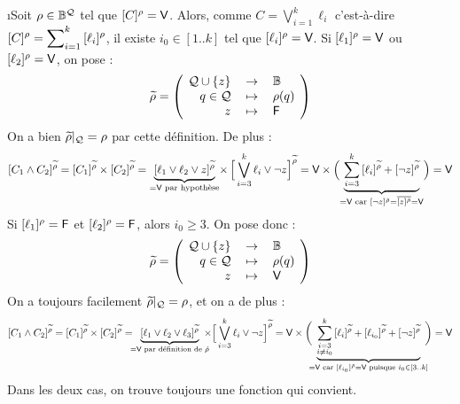 		\eqskip{1mm}
		\begin{Preuve}
			\i Soit \(\rho \in \bb{B}^\cal{Q}\) tel que \(\itp{C}{\rho} = \V\). Alors, comme \(\displaystyle C = \bigvee\nolimits_{i=1}^k \ell_i\) c'est-à-dire \(\displaystyle \itp{C}{\rho} = \sum\nolimits_{i=1}^k \, \itp{\ell_i}{\rho}\), il existe \(i_0 \in [1..k]\) tel que \(\itp{\ell_i}{\rho} = \V\). \nt
				\setlength{\tabcolsep}{2.2pt}
				\bdot Si \(\itp{\ell_1}{\rho} = \V\) ou \(\itp{\ell_2}{\rho} = \V\), on pose : 
					\[
						\widetilde{\rho} = \left( \! \begin{tabular}[h]{rcl}
							\(\cal{Q} \cup \{z\}\) & \(\rightarrow\) & \(\bb{B}\) \\
							\(q \in \cal{Q}\) & \(\mapsto\) & \(\rho(q)\) \\
							\(z\) & \(\mapsto\) & \(\F\)
						\end{tabular} \! \right)
					\]
				On a bien \(\widetilde{\rho} |_\cal{Q} = \rho\) par cette définition. De plus :
				\[ 
					\itp{C_1 \wedge C_2}{\widetilde{\rho}} = \itp{C_1}{\widetilde{\rho}} \times \itp{C_2}{\widetilde{\rho}} = \underbrace{\itp{\ell_1 \vee \ell_2 \vee z}{\widetilde{\rho}}}_{=\V \text{ par hypothèse}} \! \times \, \Big[ \bigvee_{i=3}^k \ell_i \vee \neg z \Big]^{\widetilde{\rho}} = \V \times \Big( \! \underbrace{ \sum_{i=3}^k \, \itp{\ell_i}{\widetilde{\rho}} + \itp{\neg z}{\widetilde{\rho}}}_{=\V \text{ car } \itp{\neg z}{\tilde{\rho}} = \overline{\itp{z}{\tilde{\rho}}} = \V} \! 
					\Big) = \V
				\]
				\bdot Si \(\itp{\ell_1}{\rho} = \F\) et \(\itp{\ell_2}{\rho} = \F\), alors \(i_0 \geq 3\). On pose donc :
					\[
						\widetilde{\rho} = \left( \! \begin{tabular}[h]{rcl}
							\(\cal{Q} \cup \{z\}\) & \(\rightarrow\) & \(\bb{B}\) \\
							\(q \in \cal{Q}\) & \(\mapsto\) & \(\rho(q)\) \\
							\(z\) & \(\mapsto\) & \(\V\)
						\end{tabular} \! \right)
					\]
				On a toujours facilement \(\widetilde{\rho} |_\cal{Q} = \rho\), et on a de plus :
					\[
						\itp{C_1 \wedge C_2}{\widetilde{\rho}} = \itp{C_1}{\widetilde{\rho}} \times \itp{C_2}{\widetilde{\rho}} = \!\!\! \underbrace{\itp{\ell_1 \vee \ell_2 \vee \ell_3}{\widetilde{\rho}}}_{=\V \text{ par définition de } \tilde{\rho}} \!\!\!\! \times \Big[ \bigvee_{i=3}^k \ell_i \vee \neg z \Big]^{\widetilde{\rho}} = \V \times \bigg( \!\!\! \underbrace{\sum_{\substack{i=3 \\ i \neq i_0}}^k \, \itp{\ell_i}{\widetilde{\rho}} + \itp{\ell_{i_0}}{\widetilde{\rho}} + \itp{\neg z}{\widetilde{\rho}}}_{=\V \text{ car } \itp{\ell_{i_0}}{\tilde{\rho}} = \V \text{ puisque } i_0 \in [3..k]} \!\!\! \bigg) = \V
					\]
				Dans les deux cas, on trouve toujours une fonction qui convient.
				\end{Preuve}
		
